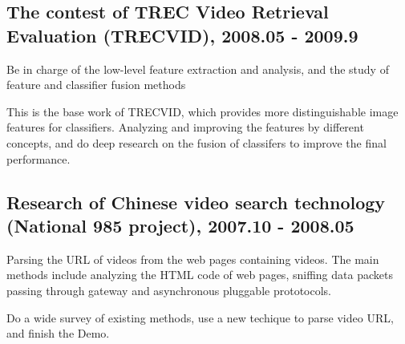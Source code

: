 \documentclass[letterpaper]{article}
\renewenvironment{itemize}{
  \begin{list}{}{
    \setlength{\leftmargin}{1.5em}
    \setlength{\itemsep}{0pt}
  }
}{
  \end{list}
}
\begin{document}
\subsection*{The contest of TREC Video Retrieval Evaluation (TRECVID), 2008.05 - 2009.9}
\begin{itemize}
\item Be in charge of the low-level feature extraction and analysis, and the study of feature and classifier fusion methods
\item This is the base work of TRECVID, which provides more distinguishable image features for classifiers. Analyzing and improving the features by different concepts, and do deep research on the fusion of classifers to improve the final performance. 
\end{itemize}
\subsection*{Research of Chinese video search technology (National 985 project), 2007.10 - 2008.05}
\begin{itemize}
\item Parsing the URL of videos from the web pages containing videos. The main methods include analyzing the HTML code of web pages, sniffing data packets passing through gateway and asynchronous pluggable prototocols.
\item Do a wide survey of existing methods, use a new techique to parse video URL, and finish the Demo.
\end{itemize}
\end{document}
